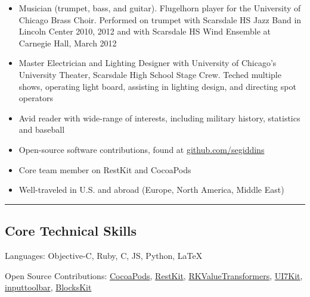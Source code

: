 \documentclass[10pt,letterpaper]{article}
\newcommand{\github}[2]
{\href{https://github.com/#1/#2}{#2}}
\begin{document}
\begin{itemize}[noitemsep, leftmargin=*]

    \item Musician (trumpet, bass, and guitar). Flugelhorn player for the University of Chicago Brass Choir. Performed on trumpet with Scarsdale HS Jazz Band in Lincoln Center 2010, 2012 and with Scarsdale HS Wind Ensemble at Carnegie Hall, March 2012

    \item Master Electrician and Lighting Designer with University of Chicago’s University Theater, Scarsdale High School Stage Crew. Teched multiple shows, operating light board, assisting in lighting design, and directing spot operators

    \item Avid reader with wide-range of interests, including military history, statistics and baseball

    \item Open-source software contributions, found at \href{https://github.com/segiddins}{github.com/segiddins}

    \item Core team member on RestKit and CocoaPods

    \item Well-traveled in U.S. and abroad (Europe, North America, Middle East)

\end{itemize}


\hrule
\vspace{-0.4em}
\subsection*{Core Technical Skills}

\begin{description*}
    \item[Languages:]
    Objective-C, Ruby, C, JS, Python, \LaTeX
	\item[Open Source Contributions:]
    \github{CocoaPods}{CocoaPods}, \github{RestKit}{RestKit}, \github{RestKit}{RKValueTransformers}, \github{youknowone}{UI7Kit}, \github{brandonhamilton}{inputtoolbar}, \github{pandamonia}{BlocksKit}
\end{description*}
\end{document}
